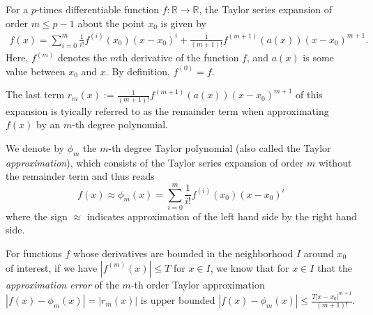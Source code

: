 \documentclass[preview]{standalone}
\begin{document}

For a $p$-times differentiable function $f: \mathbb{R} \to \mathbb{R}$, the Taylor series expansion of order $m \leq p - 1$ about the point $x_0$ is given by
\begin{align}
f(x) = \sum_{i = 0}^m \frac{1}{i!} f^{(i)}(x_0) (x - x_0)^i + \frac{1}{(m + 1)!} f^{(m+1)}(a(x)) (x - x_0)^{m + 1}.
\end{align}
Here, $f^{(m)}$ denotes the $m$th derivative of the function $f$, and $a(x)$ is some value between $x_0$ and $x$. By definition, $f^{(0)} = f$. 

The last term $r_m(x) :=  \frac{1}{(m + 1)!} f^{(m+1)}(a(x)) (x - x_0)^{m + 1}$ of this expansion is tyically referred to as the remainder term when approximating $f(x)$ by an $m$-th degree polynomial. 

We denote by $\phi_m$ the $m$-th degree Taylor polynomial (also called the Taylor \emph{approximation}), which
consists of the Taylor series expansion of order $m$ without the remainder term and thus reads
\begin{equation*}
f(x) \approx \phi_m(x) =  \sum_{i = 0}^m \frac{1}{i!} f^{(i)}(x_0) (x - x_0)^i
\end{equation*}
where the sign $\approx$ indicates approximation of the left hand side by the right hand side.

For functions $f$ whose derivatives are bounded in the neighborhood $I$ around $x_0$ of
interest, if we have $|f^{(m)}(x)| \leq T$ for
$x\in I$, we know that for $x\in I$
that the \emph{approximation error} of the $m$-th order Taylor
approximation $|f(x) - \phi_m(x)| = |r_m(x)|$ is upper bounded
$|f(x) - \phi_m(x)|\leq \frac{T|x-x_0|^{m+1}}{(m + 1)!}$.
\end{document}
